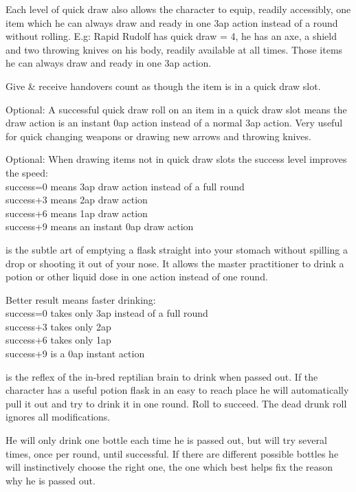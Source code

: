 Each level of quick draw also allows the character to equip, readily accessibly, one item which he can always draw and ready in one 3ap action instead of a round without rolling.
E.g: Rapid Rudolf has quick draw = 4, he has an axe, a shield and two throwing knives on his body, readily available at all times. Those items he can always draw and ready in one 3ap action.

Give \& receive handovers count as though the item is in a quick draw slot.

Optional: A successful quick draw roll on an item in a quick draw slot means the draw action is an instant 0ap action instead of a normal 3ap action. Very useful for quick changing weapons or drawing new arrows and throwing knives.

Optional: When drawing items not in quick draw slots the success level improves the speed:\\
success=0 means 3ap draw action instead of a full round\\
success+3 means 2ap draw action\\
success+6 means 1ap draw action\\
success+9 means an instant 0ap draw action


 is the subtle art of emptying a flask straight into your stomach without spilling a drop or shooting it out of your nose. It allows the master practitioner to drink a potion or other liquid dose in one action instead of one round.

Better result means faster drinking:\\
success=0 takes only 3ap instead of a full round\\
success+3 takes only 2ap\\
success+6 takes only 1ap\\
success+9 is a 0ap instant action


 is the reflex of the in-bred reptilian brain to drink when passed out. If the character has a useful potion flask in an easy to reach place he will automatically pull it out and try to drink it in one round. Roll to succeed. The dead drunk roll ignores all modifications.

He will only drink one bottle each time he is passed out, but will try several times, once per round, until successful. If there are different possible bottles he will instinctively choose the right one, the one which best helps fix the reason why he is passed out.


